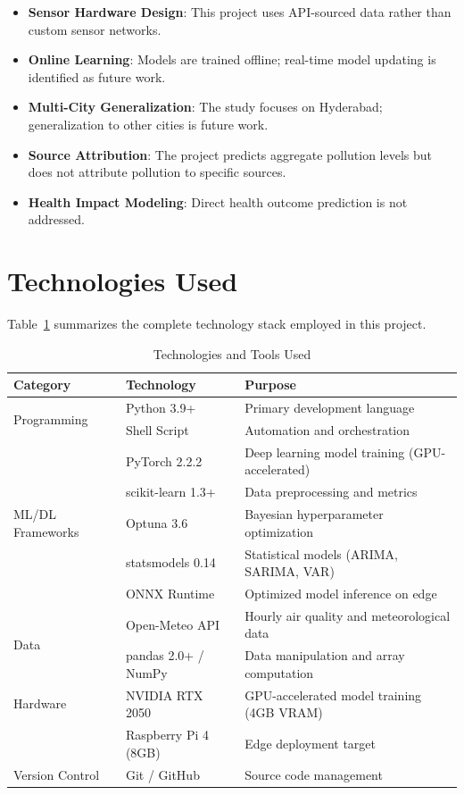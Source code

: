 \begin{itemize}
    \item \textbf{Sensor Hardware Design}: This project uses API-sourced data rather than custom sensor networks.
    \item \textbf{Online Learning}: Models are trained offline; real-time model updating is identified as future work.
    \item \textbf{Multi-City Generalization}: The study focuses on Hyderabad; generalization to other cities is future work.
    \item \textbf{Source Attribution}: The project predicts aggregate pollution levels but does not attribute pollution to specific sources.
    \item \textbf{Health Impact Modeling}: Direct health outcome prediction is not addressed.
\end{itemize}

\section{Technologies Used}

Table~\ref{tab:technologies} summarizes the complete technology stack employed in this project.

\begin{table}[H]
\centering
\caption{Technologies and Tools Used}
\label{tab:technologies}
\begin{tabular}{p{3.2cm}p{2.5cm}p{7cm}}
\toprule
\textbf{Category} & \textbf{Technology} & \textbf{Purpose} \\
\midrule
\multirow{2}{*}{Programming} & Python 3.9+ & Primary development language \\
 & Shell Script & Automation and orchestration \\
\midrule
\multirow{5}{*}{ML/DL Frameworks} & PyTorch 2.2.2 & Deep learning model training (GPU-accelerated) \\
 & scikit-learn 1.3+ & Data preprocessing and metrics \\
 & Optuna 3.6 & Bayesian hyperparameter optimization \\
 & statsmodels 0.14 & Statistical models (ARIMA, SARIMA, VAR) \\
 & ONNX Runtime & Optimized model inference on edge \\
\midrule
\multirow{2}{*}{Data} & Open-Meteo API & Hourly air quality and meteorological data \\
 & pandas 2.0+ / NumPy & Data manipulation and array computation \\
\midrule
Hardware & NVIDIA RTX 2050 & GPU-accelerated model training (4GB VRAM) \\
 & Raspberry Pi 4 (8GB) & Edge deployment target \\
\midrule
Version Control & Git / GitHub & Source code management \\
\bottomrule
\end{tabular}
\end{table}


